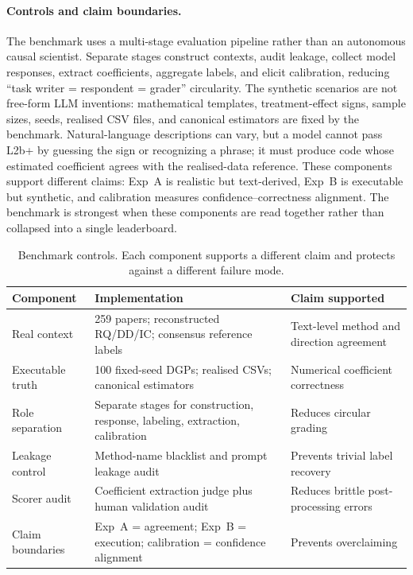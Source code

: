 \documentclass{article}
\begin{document}
\paragraph{Controls and claim boundaries.}
The benchmark uses a multi-stage evaluation pipeline rather than an
autonomous causal scientist. Separate stages construct contexts, audit
leakage, collect model responses, extract coefficients, aggregate labels,
and elicit calibration, reducing ``task writer = respondent = grader''
circularity. The synthetic scenarios are not free-form LLM inventions:
mathematical templates, treatment-effect signs, sample sizes, seeds,
realised CSV files, and canonical estimators are fixed by the benchmark.
Natural-language descriptions can vary, but a model cannot pass L2b+ by
guessing the sign or recognizing a phrase; it must produce code whose
estimated coefficient agrees with the realised-data reference. These
components support different claims: Exp~A is realistic but text-derived,
Exp~B is executable but synthetic, and calibration measures
confidence--correctness alignment. The benchmark is strongest when these
components are read together rather than collapsed into a single
leaderboard.

\begin{table}[t]
\centering
\caption{Benchmark controls. Each component supports a different claim
and protects against a different failure mode.}
\label{tab:controls}
\small
\renewcommand{\arraystretch}{1.12}
\setlength{\tabcolsep}{3pt}
\begin{tabularx}{\textwidth}{p{}p{}X}
\toprule
\textbf{Component} & \textbf{Implementation} & \textbf{Claim supported} \\
\midrule
Real context & 259 papers; reconstructed RQ/DD/IC; consensus reference
labels & Text-level method and direction agreement \\
Executable truth & 100 fixed-seed DGPs; realised CSVs; canonical
estimators & Numerical coefficient correctness \\
Role separation & Separate stages for construction, response, labeling,
extraction, calibration & Reduces circular grading \\
Leakage control & Method-name blacklist and prompt leakage audit &
Prevents trivial label recovery \\
Scorer audit & Coefficient extraction judge plus human validation audit
& Reduces brittle post-processing errors \\
Claim boundaries & Exp~A = agreement; Exp~B = execution; calibration =
confidence alignment & Prevents overclaiming \\
\bottomrule
\end{tabularx}
\end{table}
\end{document}
